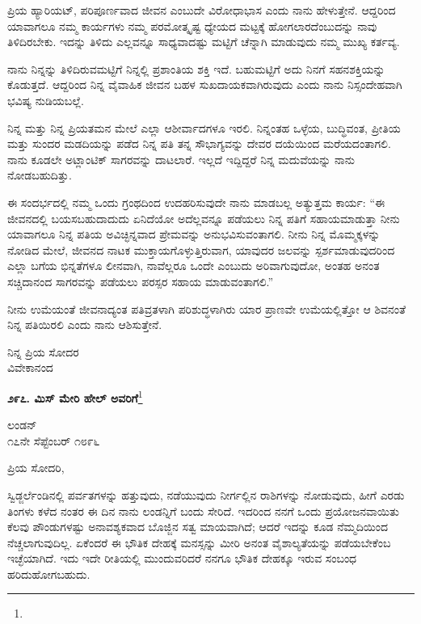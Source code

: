 ಪ್ರಿಯ ಹ್ಯಾರಿಯಟ್, ಪರಿಪೂರ್ಣವಾದ ಜೀವನ ಎಂಬುದೇ ವಿರೋಧಾಭಾಸ ಎಂದು ನಾನು ಹೇಳುತ್ತೇನೆ. ಆದ್ದರಿಂದ ಯಾವಾಗಲೂ ನಮ್ಮ ಕಾರ್ಯಗಳು ನಮ್ಮ ಪರಮೋತ್ಕೃಷ್ಟ ಧ್ಯೇಯದ ಮಟ್ಟಕ್ಕೆ ಹೋಗಲಾರದೆಂಬುದನ್ನು ನಾವು ತಿಳಿದಿರಬೇಕು. ಇದನ್ನು ತಿಳಿದು ಎಲ್ಲವನ್ನೂ ಸಾಧ್ಯವಾದಷ್ಟು ಮಟ್ಟಿಗೆ ಚೆನ್ನಾಗಿ ಮಾಡುವುದು ನಮ್ಮ ಮುಖ್ಯ ಕರ್ತವ್ಯ.

ನಾನು ನಿನ್ನನ್ನು ತಿಳಿದಿರುವಮಟ್ಟಿಗೆ ನಿನ್ನಲ್ಲಿ ಪ್ರಶಾಂತಿಯ ಶಕ್ತಿ ಇದೆ. ಬಹುಮಟ್ಟಿಗೆ ಅದು ನಿನಗೆ ಸಹನಶಕ್ತಿಯನ್ನು ಕೊಡುತ್ತದೆ. ಆದ್ದರಿಂದ ನಿನ್ನ ವೈವಾಹಿಕ ಜೀವನ ಬಹಳ ಸುಖದಾಯಕವಾಗಿರುವುದು ಎಂದು ನಾನು ನಿಸ್ಸಂದೇಹವಾಗಿ ಭವಿಷ್ಯ ನುಡಿಯಬಲ್ಲೆ.

ನಿನ್ನ ಮತ್ತು ನಿನ್ನ ಪ್ರಿಯತಮನ ಮೇಲೆ ಎಲ್ಲಾ ಆಶೀರ್ವಾದಗಳೂ ಇರಲಿ. ನಿನ್ನಂತಹ ಒಳ್ಳೆಯ, ಬುದ್ಧಿವಂತ, ಪ್ರೀತಿಯ ಮತ್ತು ಸುಂದರ ಮಡದಿಯನ್ನು ಪಡೆದ ನಿನ್ನ ಪತಿ ತನ್ನ ಸೌಭಾಗ್ಯವನ್ನು ದೇವರ ದಯೆಯಿಂದ ಮರೆಯದಂತಾಗಲಿ. ನಾನು ಕೂಡಲೇ ಅಟ್ಲಾಂಟಿಕ್ ಸಾಗರವನ್ನು ದಾಟಲಾರೆ. ಇಲ್ಲದೆ ಇದ್ದಿದ್ದರೆ ನಿನ್ನ ಮದುವೆಯನ್ನು ನಾನು ನೋಡಬಹುದಿತ್ತು.

ಈ ಸಂದರ್ಭದಲ್ಲಿ ನಮ್ಮ ಒಂದು ಗ್ರಂಥದಿಂದ ಉದಹರಿಸುವುದೇ ನಾನು ಮಾಡಬಲ್ಲ ಅತ್ಯುತ್ತಮ ಕಾರ್ಯ: “ಈ ಜೀವನದಲ್ಲಿ ಬಯಸಬಹುದಾದುದು ಏನಿದೆಯೋ ಅದೆಲ್ಲವನ್ನೂ ಪಡೆಯಲು ನಿನ್ನ ಪತಿಗೆ ಸಹಾಯಮಾಡುತ್ತಾ ನೀನು ಯಾವಾಗಲೂ ನಿನ್ನ ಪತಿಯ ಅವಿಚ್ಛಿನ್ನವಾದ ಪ್ರೇಮವನ್ನು ಅನುಭವಿಸುವಂತಾಗಲಿ. ನೀನು ನಿನ್ನ ಮೊಮ್ಮಕ್ಕಳನ್ನು ನೋಡಿದ ಮೇಲೆ, ಜೀವನದ ನಾಟಕ ಮುಕ್ತಾಯಗೊಳ್ಳುತ್ತಿರುವಾಗ, ಯಾವುದರ ಜಲವನ್ನು ಸ್ಪರ್ಶಮಾಡುವುದರಿಂದ ಎಲ್ಲಾ ಬಗೆಯ ಭಿನ್ನತೆಗಳೂ ಲೀನವಾಗಿ, ನಾವೆಲ್ಲರೂ ಒಂದೇ ಎಂಬುದು ಅರಿವಾಗುವುದೋ, ಅಂತಹ ಅನಂತ ಸಚ್ಚಿದಾನಂದ ಸಾಗರವನ್ನು ಪಡೆಯಲು ಪರಸ್ಪರ ಸಹಾಯ ಮಾಡುವಂತಾಗಲಿ.”

ನೀನು ಉಮೆಯಂತೆ ಜೀವನಾದ್ಯಂತ ಪತಿವ್ರತಳಾಗಿ ಪರಿಶುದ್ಧಳಾಗಿರು\enginline{-} ಯಾರ ಪ್ರಾಣವೇ ಉಮೆಯಲ್ಲಿತ್ತೋ ಆ ಶಿವನಂತೆ ನಿನ್ನ ಪತಿಯಿರಲಿ ಎಂದು ನಾನು ಆಶಿಸುತ್ತೇನೆ.

{\flushright
ನಿನ್ನ ಪ್ರಿಯ ಸೋದರ\\ವಿವೇಕಾನಂದ\par}

\begin{center}
\textbf{೨೯೭. ಮಿಸ್ ಮೇರಿ ಹೇಲ್‌ ಅವರಿಗೆ}\footnote{}
\end{center}

\begin{flushright}
ಲಂಡನ್\\೧೭ನೇ ಸೆಪ್ಟೆಂಬರ್ ೧೮೯೬
\end{flushright}

\noindent
ಪ್ರಿಯ ಸೋದರಿ,

ಸ್ವಿಡ್ಜರ್ಲೆಂಡಿನಲ್ಲಿ ಪರ್ವತಗಳನ್ನು ಹತ್ತುವುದು, ನಡೆಯುವುದು ನೀರ್ಗಲ್ಲಿನ ರಾಶಿಗಳನ್ನು ನೋಡುವುದು, ಹೀಗೆ ಎರಡು ತಿಂಗಳು ಕಳೆದ ನಂತರ ಈ ದಿನ ನಾನು ಲಂಡನ್ನಿಗೆ ಬಂದು ಸೇರಿದೆ. ಇದರಿಂದ ನನಗೆ ಒಂದು ಪ್ರಯೋಜನವಾಯಿತು\enginline{-} ಕೆಲವು ಪೌಂಡುಗಳಷ್ಟು ಅನಾವಶ್ಯಕವಾದ ಬೊಜ್ಜಿನ ಸತ್ವ ಮಾಯವಾಗಿದೆ; ಆದರೆ ಇದನ್ನು ಕೂಡ ನೆಮ್ಮದಿಯಿಂದ ನೆಚ್ಚಲಾಗುವುದಿಲ್ಲ. ಏಕೆಂದರೆ ಈ ಭೌತಿಕ ದೇಹಕ್ಕೆ ಮನಸ್ಸನ್ನು ಮೀರಿ ಅನಂತ ವೈಶಾಲ್ಯತೆಯನ್ನು ಪಡೆಯಬೇಕೆಂಬ ಇಚ್ಛೆಯಾಗಿದೆ. ಇದು ಇದೇ ರೀತಿಯಲ್ಲಿ ಮುಂದುವರಿದರೆ ನನಗೂ ಭೌತಿಕ ದೇಹಕ್ಕೂ ಇರುವ ಸಂಬಂಧ ಹರಿದುಹೋಗಬಹುದು.

